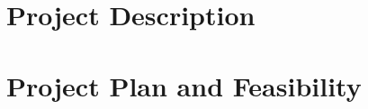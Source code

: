 \documentclass[12pt,a4paper]{article}
\begin{document}



\section*{Project Description}


\section*{Project Plan and Feasibility}

%


{}
\end{document}
